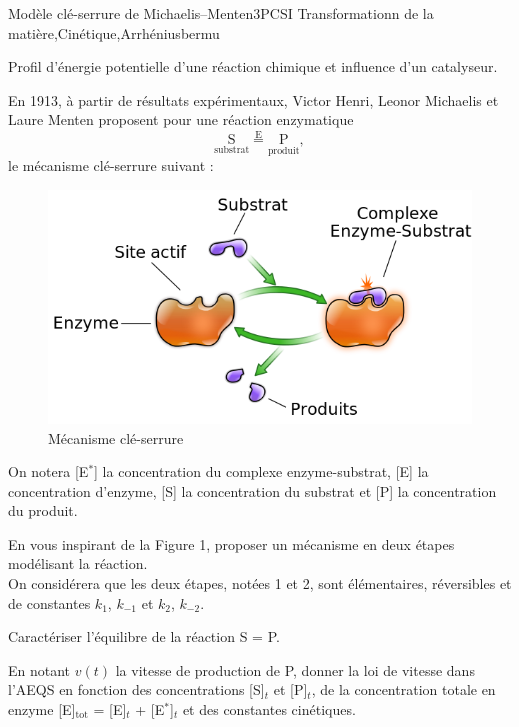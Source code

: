 
\begin{exercise}{Modèle clé-serrure de Michaelis--Menten}{3}{PCSI}
{Transformationn de la matière,Cinétique,Arrhénius}{bermu}

\begin{questions}
\questioncours Profil d'énergie potentielle d'une réaction chimique et influence d'un catalyseur.

\begin{EnvUplevel}
     En 1913, à partir de résultats expérimentaux, Victor Henri, Leonor Michaelis et Laure Menten proposent pour une réaction enzymatique
     $$\mathrm{\underset{\text{substrat}}{S} \overset{E}{=} \underset{\text{produit}}{P}},$$
     le mécanisme clé-serrure suivant :
     \begin{figure}[H]
         \centering
         \includegraphics[width=0.6\linewidth]{gene/michaelis.png}
         \caption{Mécanisme clé-serrure}
         \label{fig:my_label}
     \end{figure}
     
     On notera [E$^\ast$] la concentration du complexe enzyme-substrat, [E] la concentration d'enzyme, [S] la concentration du substrat et [P] la concentration du produit.
     
\end{EnvUplevel}

\question En vous inspirant de la Figure 1, proposer un mécanisme en deux étapes modélisant la réaction. \\ On considérera que les deux étapes, notées 1 et 2, sont élémentaires, réversibles et de constantes $k_1$, $k_{-1}$ et $k_2$, $k_{-2}$.

\question Caractériser l'équilibre de la réaction S = P.

\question En notant $v(t)$ la vitesse de production de P, donner la loi de vitesse dans l'AEQS en fonction des concentrations [S]$_t$ et [P]$_t$, de la concentration totale en enzyme [E]$_\text{tot}$ = [E]$_t$ + [E$^\ast$]$_t$ et des constantes cinétiques.


\end{questions}
\end{exercise}
